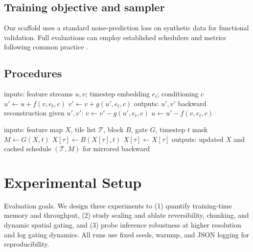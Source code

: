 \documentclass{article}
\begin{document}
\subsection{Training objective and sampler}
Our scaffold uses a standard noise-prediction loss on synthetic data for functional validation. Full evaluations can employ established schedulers and metrics following common practice \cite{dhariwal-2021-diffusion,hessel-2021-clipscore}.

\subsection{Procedures}
\begin{algorithm}
\caption{Reversible dual-stream block with additive coupling}
\begin{algorithmic}
\State inputs: feature streams \(u, v\); timestep embedding \(e_t\); conditioning \(c\)
\State \(u' \leftarrow u + f(v, e_t, c)\)
\State \(v' \leftarrow v + g(u', e_t, c)\)
\State outputs: \(u', v'\)
\Statex
\State backward reconstruction given \(u', v'\):
\State \(v \leftarrow v' - g(u', e_t, c)\)
\State \(u \leftarrow u' - f(v, e_t, c)\)
\end{algorithmic}
\end{algorithm}

\begin{algorithm}
\caption{Tile-scheduled forward/backward with dynamic gating}
\begin{algorithmic}
\State inputs: feature map \(X\), tile list \(\mathcal{T}\), block \(B\), gate \(G\), timestep \(t\)
\State mask \(M \leftarrow G(X, t)\) 
    \State \(X[\tau] \leftarrow B(X[\tau], t)\)
  \Else
    \State \(X[\tau] \leftarrow X[\tau]\) 
  \EndIf
\EndFor
\State outputs: updated \(X\) and cached schedule \((\mathcal{T}, M)\) for mirrored backward
\end{algorithmic}
\end{algorithm}

\section{Experimental Setup}
Evaluation goals. We design three experiments to (1) quantify training-time memory and throughput, (2) study scaling and ablate reversibility, chunking, and dynamic spatial gating, and (3) probe inference robustness at higher resolution and log gating dynamics. All runs use fixed seeds, warmup, and JSON logging for reproducibility.
\end{document}
